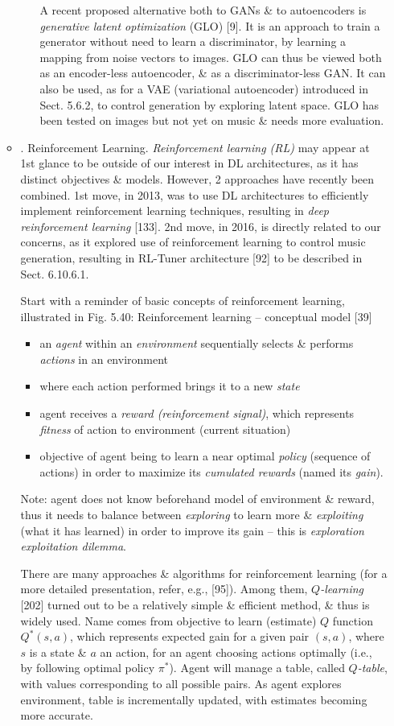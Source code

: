 \documentclass{article}
\begin{document}
\begin{itemize}
\begin{itemize}
\begin{itemize}
			A recent proposed alternative both to GANs \& to autoencoders is {\it generative latent optimization} (GLO) [9]. It is an approach to train a generator without need to learn a discriminator, by learning a mapping from noise vectors to images. GLO can thus be viewed both as an encoder-less autoencoder, \& as a discriminator-less GAN. It can also be used, as for a VAE (variational autoencoder) introduced in Sect. 5.6.2, to control generation by exploring latent space. GLO has been tested on images but not yet on music \& needs more evaluation.
		\end{itemize}
		\item {. Reinforcement Learning.} {\it Reinforcement learning (RL)} may appear at 1st glance to be outside of our interest in DL architectures, as it has distinct objectives \& models. However, 2 approaches have recently been combined. 1st move, in 2013, was to use DL architectures to efficiently implement reinforcement learning techniques, resulting in {\it deep reinforcement learning} [133]. 2nd move, in 2016, is directly related to our concerns, as it explored use of reinforcement learning to control music generation, resulting in RL-Tuner architecture [92] to be described in Sect. 6.10.6.1.
		
		Start with a reminder of basic concepts of reinforcement learning, illustrated in {\sf Fig. 5.40: Reinforcement learning – conceptual model [39]}
		\begin{itemize}
			\item an {\it agent} within an {\it environment} sequentially selects \& performs {\it actions} in an environment
			\item where each action performed brings it to a new {\it state}
			\item agent receives a {\it reward (reinforcement signal)}, which represents {\it fitness} of action to environment (current situation)
			\item objective of agent being to learn a near optimal {\it policy} (sequence of actions) in order to maximize its {\it cumulated rewards} (named its {\it gain}).
		\end{itemize}
		Note: agent does not know beforehand model of environment \& reward, thus it needs to balance between {\it exploring} to learn more \& {\it exploiting} (what it has learned) in order to improve its gain -- this is {\it exploration exploitation dilemma}.
		
		There are many approaches \& algorithms for reinforcement learning (for a more detailed presentation, refer, e.g., [95]). Among them, {\it$Q$-learning} [202] turned out to be a relatively simple \& efficient method, \& thus is widely used. Name comes from objective to learn (estimate) $Q$ function $Q^*(s,a)$, which represents expected gain for a given pair $(s,a)$, where $s$ is a state \& $a$ an action, for an agent choosing actions optimally (i.e., by following optimal policy $\pi^*$). Agent will manage a table, called {\it$Q$-table}, with values corresponding to all possible pairs. As agent explores environment, table is incrementally updated, with estimates becoming more accurate.
		

\end{itemize}
\end{itemize}
\end{document}
